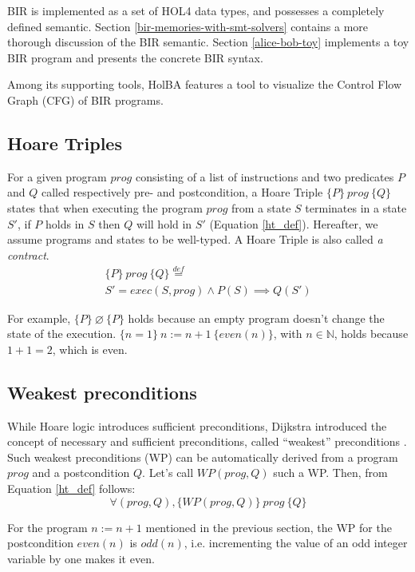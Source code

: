 \documentclass[10pt,a4paper]{article}
\newcommand{\htriple}[3]{\ensuremath{\{#1\}~#2~\{#3\}}}
\newcommand{\WP}{\ensuremath{\mathit{WP}}}
\newcommand{\eqdef}{\stackrel{def}{=}}
\begin{document}
\begin{multicols}{2}
BIR is implemented as a set of HOL4 data types, and possesses a completely defined semantic. Section \ref{bir-memories-with-smt-solvers} contains a more thorough discussion of the BIR semantic. Section \ref{alice-bob-toy} implements a toy BIR program and presents the concrete BIR syntax.

Among its supporting tools, HolBA features a tool to visualize the Control Flow Graph ({CFG}) of BIR programs.

\subsection{Hoare Triples} \label{hoare-triples}

For a given program $prog$ consisting of a list of instructions and two predicates $P$ and $Q$ called respectively pre- and postcondition, a Hoare Triple \htriple{P}{prog}{Q} states that when executing the program $prog$ from a state $S$ terminates in a state $S'$, if $P$ holds in $S$ then $Q$ will hold in $S'$ (Equation \ref{ht_def}). Hereafter, we assume programs and states to be well-typed. A Hoare Triple is also called \textit{a contract}.
%
\begin{multline}
  \htriple{P}{prog}{Q} \eqdef\\
  S' = exec(S, prog) \land P(S) \implies Q(S')
  \label{ht_def}
\end{multline}

For example, \htriple{P}{\varnothing}{P} holds because an empty program doesn't change the state of the execution. \htriple{n=1}{n:=n+1}{even(n)}, with $n \in \mathbb{N}$, holds because $1+1=2$, which is even.

\subsection{Weakest preconditions}

While Hoare logic introduces sufficient preconditions, Dijkstra introduced the concept of necessary and sufficient preconditions, called ``weakest'' preconditions \cite{dijkstra_guarded_1975}. Such weakest preconditions (WP) can be automatically derived from a program $prog$ and a postcondition $Q$. Let's call $\WP(prog, Q)$ such a WP. Then, from Equation \ref{ht_def} follows:
%
\begin{equation}
  \forall (prog, Q),
  \htriple{\WP(prog,Q)}{prog}{Q}
  \label{ht_wp_eq}
\end{equation}

For the program $n:=n+1$ mentioned in the previous section, the WP for the postcondition $even(n)$ is $odd(n)$, i.e. incrementing the value of an odd integer variable by one makes it even.


\end{multicols}
\end{document}
